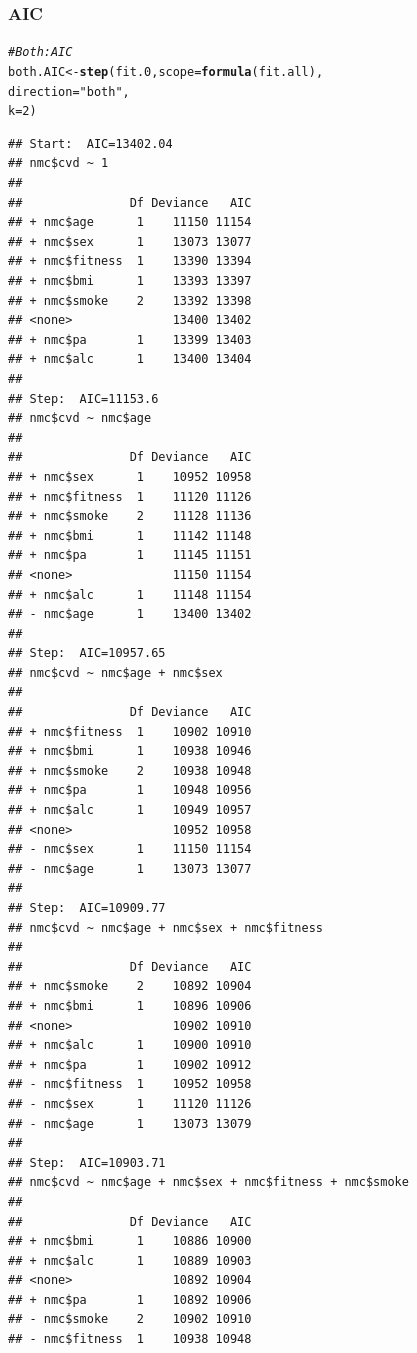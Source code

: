 \documentclass{article}\usepackage[]{graphicx}\usepackage[]{xcolor}
\makeatletter
\newcommand{\hlnum}[1]{\textcolor[rgb]{0.686,0.059,0.569}{#1}}%
\newcommand{\hlstr}[1]{\textcolor[rgb]{0.192,0.494,0.8}{#1}}%
\newcommand{\hlcom}[1]{\textcolor[rgb]{0.678,0.584,0.686}{\textit{#1}}}%
\newcommand{\hlstd}[1]{\textcolor[rgb]{0.345,0.345,0.345}{#1}}%
\newcommand{\hlkwb}[1]{\textcolor[rgb]{0.69,0.353,0.396}{#1}}%
\newcommand{\hlkwc}[1]{\textcolor[rgb]{0.333,0.667,0.333}{#1}}%
\newcommand{\hlkwd}[1]{\textcolor[rgb]{0.737,0.353,0.396}{\textbf{#1}}}%
\newenvironment{kframe}{%
 \def\at@end@of@kframe{}%
 \ifinner\ifhmode%
  \def\at@end@of@kframe{\end{minipage}}%
  \begin{minipage}{\columnwidth}%
 \fi\fi%
 \def\FrameCommand##1{\hskip\@totalleftmargin \hskip-\fboxsep
 \colorbox{shadecolor}{##1}\hskip-\fboxsep
     \hskip-\linewidth \hskip-\@totalleftmargin \hskip\columnwidth}%
 \MakeFramed {\advance\hsize-\width
   \@totalleftmargin\z@ \linewidth\hsize
   \@setminipage}}%
 {\par\unskip\endMakeFramed%
 \at@end@of@kframe}
\newenvironment{knitrout}{}{} %
\makeatother
\begin{document}
        \subsubsection{AIC}
\begin{knitrout}
\color{fgcolor}\begin{kframe}
\begin{alltt}
\hlcom{#Both: AIC }
\hlstd{both.AIC} \hlkwb{<-} \hlkwd{step}\hlstd{(fit.0,} \hlkwc{scope}\hlstd{=}\hlkwd{formula}\hlstd{(fit.all),}
                 \hlkwc{direction}\hlstd{=}\hlstr{"both"}\hlstd{,}
                 \hlkwc{k}\hlstd{=}\hlnum{2}\hlstd{)}
\end{alltt}
\begin{verbatim}
## Start:  AIC=13402.04
## nmc$cvd ~ 1
## 
##               Df Deviance   AIC
## + nmc$age      1    11150 11154
## + nmc$sex      1    13073 13077
## + nmc$fitness  1    13390 13394
## + nmc$bmi      1    13393 13397
## + nmc$smoke    2    13392 13398
## <none>              13400 13402
## + nmc$pa       1    13399 13403
## + nmc$alc      1    13400 13404
## 
## Step:  AIC=11153.6
## nmc$cvd ~ nmc$age
## 
##               Df Deviance   AIC
## + nmc$sex      1    10952 10958
## + nmc$fitness  1    11120 11126
## + nmc$smoke    2    11128 11136
## + nmc$bmi      1    11142 11148
## + nmc$pa       1    11145 11151
## <none>              11150 11154
## + nmc$alc      1    11148 11154
## - nmc$age      1    13400 13402
## 
## Step:  AIC=10957.65
## nmc$cvd ~ nmc$age + nmc$sex
## 
##               Df Deviance   AIC
## + nmc$fitness  1    10902 10910
## + nmc$bmi      1    10938 10946
## + nmc$smoke    2    10938 10948
## + nmc$pa       1    10948 10956
## + nmc$alc      1    10949 10957
## <none>              10952 10958
## - nmc$sex      1    11150 11154
## - nmc$age      1    13073 13077
## 
## Step:  AIC=10909.77
## nmc$cvd ~ nmc$age + nmc$sex + nmc$fitness
## 
##               Df Deviance   AIC
## + nmc$smoke    2    10892 10904
## + nmc$bmi      1    10896 10906
## <none>              10902 10910
## + nmc$alc      1    10900 10910
## + nmc$pa       1    10902 10912
## - nmc$fitness  1    10952 10958
## - nmc$sex      1    11120 11126
## - nmc$age      1    13073 13079
## 
## Step:  AIC=10903.71
## nmc$cvd ~ nmc$age + nmc$sex + nmc$fitness + nmc$smoke
## 
##               Df Deviance   AIC
## + nmc$bmi      1    10886 10900
## + nmc$alc      1    10889 10903
## <none>              10892 10904
## + nmc$pa       1    10892 10906
## - nmc$smoke    2    10902 10910
## - nmc$fitness  1    10938 10948

\end{verbatim}
\end{kframe}
\end{knitrout}
\end{document}
